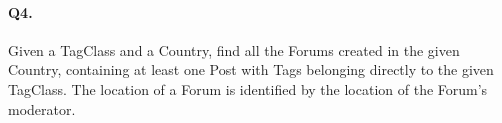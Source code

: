 \paragraph{Q4.}
Given a TagClass and a Country, find all the Forums created in the given
Country, containing at least one Post with Tags belonging directly to
the given TagClass.
The location of a Forum is identified by the location of the Forum's
moderator.
